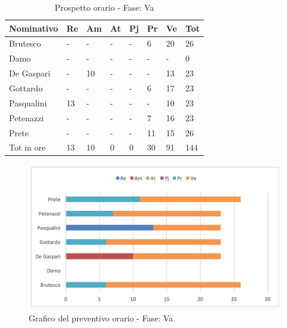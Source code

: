 							\begin{table}[H] \begin{center} \begin{tabular}{llllllll}
							\toprule
							\textbf{Nominativo}		&	\textbf{Re}	&	\textbf{Am}	&	\textbf{At}	&	\textbf{Pj}	&	\textbf{Pr}	&	\textbf{Ve}	&	\textbf{Tot}\\
							\midrule
							Brutesco	&	-	&	-	&	-	&	-	&	6	&	20	&	26	 \\
							Damo	&	-	&	-	&	-	&	-	&	-	&	-	&	0	 \\
							De Gaspari	&	-	&	10	&	-	&	-	&	-	&	13	&	23	 \\
							Gottardo	&	-	&	-	&	-	&	-	&	6	&	17	&	23	 \\
							Pasqualini	&	13	&	-	&	-	&	-	&	-	&	10	&	23	 \\
							Petenazzi	&	-	&	-	&	-	&	-	&	7	&	16	&	23	 \\
							Prete	&	-	&	-	&	-	&	-	&	11	&	15	&	26	 \\
							\midrule
							Tot in ore	&	13	&	10	&	0	&	0	&	30	&	91	&	144	 \\


							\bottomrule
							\end{tabular} \end{center} \caption{Prospetto orario - Fase:
							Va
							}\label{tab:h_Va} \end{table}		\begin{figure}[H]  \centering  \includegraphics[scale=0.42]{img/h_Va}
									\caption{Grafico del preventivo orario - Fase: 								Va	}  \label{fig:h_Va	} \end{figure}
